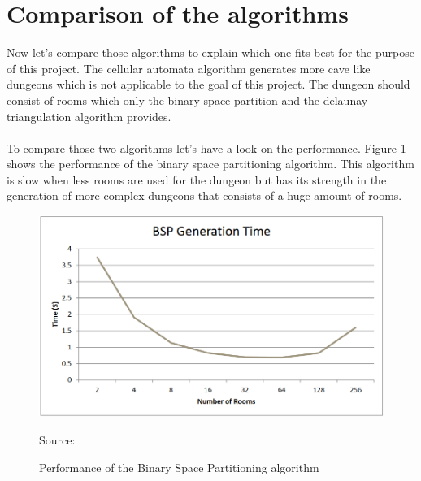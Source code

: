 \documentclass[a4paper,12pt,oneside]{scrreprt}
\begin{document}
\section{Comparison of the algorithms}
Now let's compare those algorithms to explain which one fits best for the purpose of this project. The cellular automata algorithm generates more cave like dungeons which is not applicable to the goal of this project. The dungeon should consist of rooms which only the binary space partition and the delaunay triangulation algorithm provides. 
\\
\\
To compare those two algorithms let's have a look on the performance. Figure \ref{fig:bsp_performance} shows the performance of the binary space partitioning algorithm. This algorithm is slow when less rooms are used for the dungeon but has its strength in the generation of more complex dungeons that consists of a huge amount of rooms.  
\begin{figure}[htb]
\centering
\includegraphics[scale=0.5]{images/bsp_performance.png} 
\caption{Performance of the Binary Space Partitioning algorithm}
Source: \cite[][]{williams_investigation_nodate}
\label{fig:bsp_performance}
\end{figure}
\end{document}
